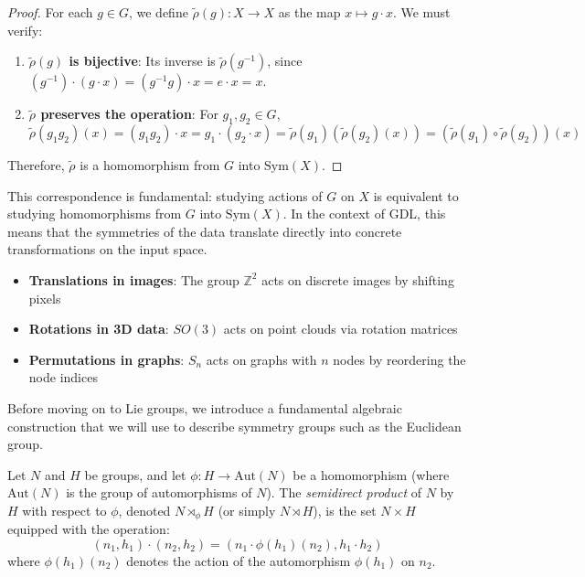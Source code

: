 \begin{proof}
For each $g \in G$, we define $\tilde{\rho}(g): X \rightarrow X$ as the map $x \mapsto g \cdot x$. We must verify:
\begin{enumerate}
    \item \textbf{$\tilde{\rho}(g)$ is bijective}: Its inverse is $\tilde{\rho}(g^{-1})$, since $(g^{-1}) \cdot (g \cdot x) = (g^{-1}g) \cdot x = e \cdot x = x$.
    \item \textbf{$\tilde{\rho}$ preserves the operation}: For $g_1, g_2 \in G$,
    \begin{equation}
    \tilde{\rho}(g_1 g_2)(x) = (g_1 g_2) \cdot x = g_1 \cdot (g_2 \cdot x) = \tilde{\rho}(g_1)(\tilde{\rho}(g_2)(x)) = (\tilde{\rho}(g_1) \circ \tilde{\rho}(g_2))(x)
    \end{equation}
\end{enumerate}
Therefore, $\tilde{\rho}$ is a homomorphism from $G$ into $\text{Sym}(X)$.
\end{proof}

This correspondence is fundamental: studying actions of $G$ on $X$ is equivalent to studying homomorphisms from $G$ into $\text{Sym}(X)$. In the context of \gls{GDL}, this means that the symmetries of the data translate directly into concrete transformations on the input space.

\begin{example}\label{ex:acciones_grupo_dl}
\leavevmode
\begin{itemize}
    \item \textbf{Translations in images}: The group $\mathbb{Z}^2$ acts on discrete images by shifting pixels
    \item \textbf{Rotations in 3D data}: $SO(3)$ acts on point clouds via rotation matrices
    \item \textbf{Permutations in graphs}: $S_n$ acts on graphs with $n$ nodes by reordering the node indices
\end{itemize}
\end{example}

Before moving on to Lie groups, we introduce a fundamental algebraic construction that we will use to describe symmetry groups such as the Euclidean group.

\begin{definition}\label{def:producto_semidirecto}
Let $N$ and $H$ be groups, and let $\phi: H \to \mathrm{Aut}(N)$ be a homomorphism (where $\mathrm{Aut}(N)$ is the group of automorphisms of $N$). The \textit{semidirect product} of $N$ by $H$ with respect to $\phi$, denoted $N \rtimes_\phi H$ (or simply $N \rtimes H$), is the set $N \times H$ equipped with the operation:
\begin{equation}\label{eq:producto_semidirecto}
(n_1, h_1) \cdot (n_2, h_2) = (n_1 \cdot \phi(h_1)(n_2), h_1 \cdot h_2)
\end{equation}
where $\phi(h_1)(n_2)$ denotes the action of the automorphism $\phi(h_1)$ on $n_2$.
\end{definition}

